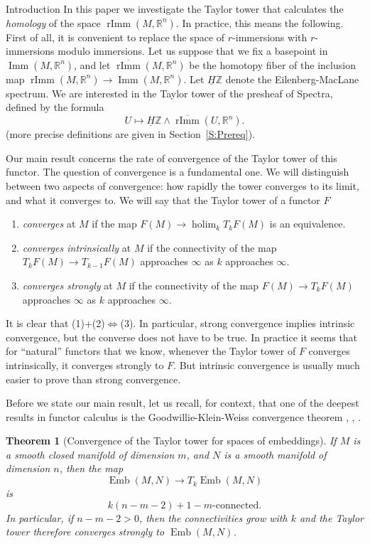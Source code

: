\documentclass[12pt]{amsart}
\newcommand{\R}{{\mathbb R}}
\newcommand{\Z}{{\mathbb Z}}
\newcommand{\holim}{\operatorname{holim}}
\newcommand{\Emb}{\operatorname{Emb}}
\newcommand{\Imm}{\operatorname{Imm}}
\newcommand{\rImm}{\operatorname{rImm}}
\newcommand{\rbar}{\overline{\rImm}}
\newcommand{\HZ}{\underline{H}\Z}
\theoremstyle{plain}
\newtheorem{thm}{Theorem}[section]
\theoremstyle{definition}
\theoremstyle{remark}
\begin{document}
\begin{section}{Introduction}
In this paper we investigate the Taylor tower that calculates the {\it homology} of the space $\rImm(M, \R^n)$. In practice, this means the following. First of all, it is convenient to replace the space of $r$-immersions with $r$-immersions modulo immersions. Let us suppose that we fix a basepoint in $\Imm(M, \R^n)$, and let $\rbar(M, \R^n)$ be the homotopy fiber of the inclusion map $\rImm(M, \R^n)\to \Imm(M, \R^n)$. Let $\HZ$ denote the Eilenberg-MacLane spectrum. We are interested in the Taylor tower of the presheaf of Spectra, defined by the formula
\[
U \mapsto  \HZ\wedge  \rbar(U, \R^n).
\] 
(more precise definitions are given in Section~\ref{S:Prereq}). 

Our main result concerns the rate of convergence of the Taylor tower of this functor. The question of convergence is a fundamental one. We will distinguish between two aspects of convergence: how rapidly the tower converges to its limit, and what it converges to.  
We will say that the Taylor tower of a functor $F$ 
\begin{enumerate}
\item {\it converges} at $M$ if the map $F(M)\to \holim_k T_kF(M)$ is an equivalence.
\item {\it converges intrinsically} at $M$ if the connectivity of the map $T_kF(M)\to T_{k-1}F(M)$ approaches $\infty$ as $k$ approaches $\infty$. 
\item {\it converges strongly} at $M$ if the connectivity of the map $F(M)\to T_kF(M)$ approaches $\infty$ as $k$ approaches $\infty$. 
\end{enumerate}
It is clear that (1)+(2)$\iff$(3). In particular, strong convergence implies intrinsic convergence, but the converse does not have to be true. In practice it seems that for ``natural'' functors that we know, whenever the Taylor tower of $F$ converges intrinsically, it converges strongly to $F$. But intrinsic convergence is usually much easier to prove than strong convergence.

Before we state our main result, let us recall, for context, that one of the deepest results in functor calculus is the Goodwillie-Klein-Weiss convergence theorem \cite{GW:EI2}, \cite{GK:EmbDisj}, \cite{GK}.

\begin{thm}[Convergence of the Taylor tower for spaces of embeddings]\label{T:GKW-Convergence}
If $M$ is a smooth closed manifold of dimension $m$, and $N$ is a smooth manifold of dimension $n$, then the map $$\Emb(M,N) \to T_k\Emb(M,N)$$ is $$k(n-m-2)+1-m\text{-connected}.$$ In particular, if $n-m-2>0$, then the connectivities grow with $k$ and the Taylor tower therefore converges strongly to $\Emb(M,N)$.
\end{thm}


\end{section}
\end{document}
